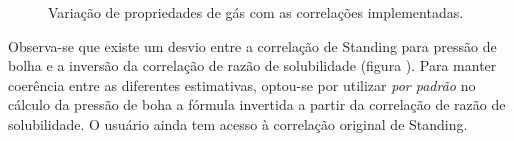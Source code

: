 \documentclass[final,3p]{elsarticle}
\numberwithin{equation}{section}
\begin{document}
        \begin{figure}
            \centering

            \caption{Variação de propriedades de gás com as correlações implementadas.}
            \label{fig:grid_pvt_gas}
          \end{figure}

          Observa-se que existe um desvio entre a correlação de Standing para pressão de bolha e a inversão da correlação de razão de solubilidade (figura ). Para manter coerência entre as diferentes estimativas, optou-se por utilizar \emph{por padrão} no cálculo da pressão de boha a fórmula invertida a partir da correlação de razão de solubilidade. O usuário ainda tem acesso à correlação original de Standing.
\end{document}
